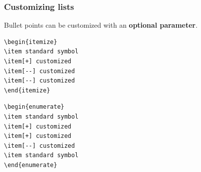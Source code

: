 \begin{frame}[fragile]
\frametitle{Customizing lists}

\noindent Bullet points can be customized with an \textbf{optional parameter}.

\begin{multicols}{2}

\begin{lstlisting}
\begin{itemize}
\item standard symbol
\item[+] customized
\item[--] customized
\item[--] customized
\end{itemize}
\end{lstlisting}

\columnbreak{}

\end{multicols}

\begin{multicols}{2}

\begin{lstlisting}
\begin{enumerate}
\item standard symbol
\item[+] customized
\item[+] customized
\item[--] customized
\item standard symbol
\end{enumerate}
\end{lstlisting}

\columnbreak{}


\end{multicols}

\end{frame}


